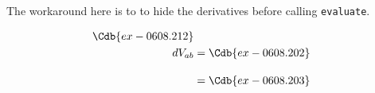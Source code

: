 \documentclass[12pt]{cdblatex}
\begin{document}
The workaround here is to to hide the derivatives before calling {\tt evaluate}.

\begin{align*}
   \Cdb{ex-0608.212}\\
   dV_{a b} &= \Cdb{ex-0608.202}\\[10pt]
            &= \Cdb{ex-0608.203}\\[10pt]
\end{align*}
\end{document}
